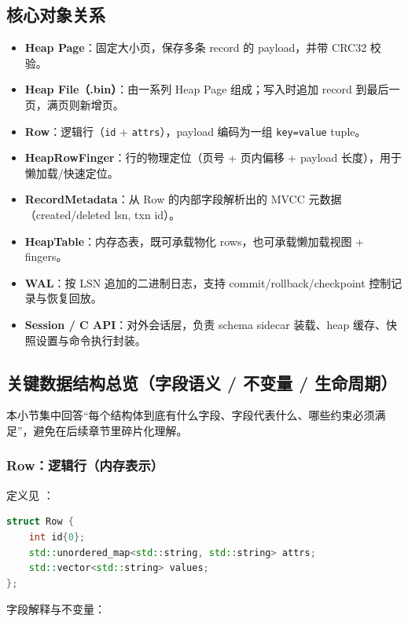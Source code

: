 \subsection{核心对象关系}

\begin{itemize}
  \item \textbf{Heap Page}：固定大小页，保存多条 record 的 payload，并带 CRC32 校验。
  \item \textbf{Heap File（.bin）}：由一系列 Heap Page 组成；写入时追加 record 到最后一页，满页则新增页。
  \item \textbf{Row}：逻辑行（\texttt{id} + \texttt{attrs}），payload 编码为一组 \texttt{key=value} tuple。
  \item \textbf{HeapRowFinger}：行的物理定位（页号 + 页内偏移 + payload 长度），用于懒加载/快速定位。
  \item \textbf{RecordMetadata}：从 Row 的内部字段解析出的 MVCC 元数据（created/deleted lsn, txn id）。
  \item \textbf{HeapTable}：内存态表，既可承载物化 rows，也可承载懒加载视图 + fingers。
  \item \textbf{WAL}：按 LSN 追加的二进制日志，支持 commit/rollback/checkpoint 控制记录与恢复回放。
  \item \textbf{Session / C API}：对外会话层，负责 schema sidecar 装载、heap 缓存、快照设置与命令执行封装。
\end{itemize}

\subsection{关键数据结构总览（字段语义 / 不变量 / 生命周期）}

本小节集中回答“每个结构体到底有什么字段、字段代表什么、哪些约束必须满足”，避免在后续章节里碎片化理解。

\subsubsection{Row：逻辑行（内存表示）}

定义见 ：

\begin{lstlisting}[language=C++,caption={Row（原型）}]
struct Row {
    int id{0};
    std::unordered_map<std::string, std::string> attrs;
    std::vector<std::string> values;
};
\end{lstlisting}

字段解释与不变量：

